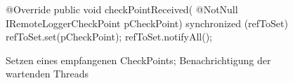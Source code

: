 \begin{wrapfigure}[9]{r}[0cm]{0.55\textwidth}
    \centering
	\vspace{-5px}
	\begin{spacing}{0.75}
		\begin{javacode}[firstnumber=172]
@Override
public void checkPointReceived(
  @NotNull IRemoteLoggerCheckPoint pCheckPoint)
{
  synchronized (refToSet)
  {
    refToSet.set(pCheckPoint);
    refToSet.notifyAll();
  }
}\end{javacode}
	\end{spacing}
	\caption{Setzen eines empfangenen CheckPoints; Benachrichtigung der wartenden Threads}
	\label{fig:CODE_TestRemoteLogger-test_communication-RemoteListener}
\end{wrapfigure}